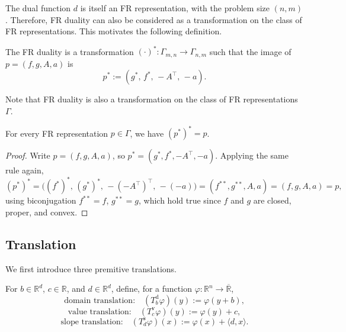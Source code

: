 The dual function $d$ is itself an FR representation, with the problem size \((n, m)\). Therefore, FR duality can also be considered as a transformation on the class of FR representations. This motivates the following definition.


\begin{definition}[FR Duality]
The FR duality is a transformation \((\cdot)^*: \Gamma_{m, n} \to \Gamma_{n, m}\) such that the image of \(p=(f,g,A,a)\) is
\[
p^*
:=
(g^*,\,f^*,\,-A^\top,\,-a).
\]
\end{definition}

Note that FR duality is also a transformation on the class of FR representations $\Gamma$.




 
\begin{proposition}[Involution]
\label{prop:involution}
For every FR representation \(p \in \Gamma\), we have \((p^*)^*=p\).
\end{proposition}

\begin{proof}
Write \(p=(f,g,A,a)\), so \(p^*=(g^*,f^*,-A^\top,-a)\). Applying the
same rule again,
\[
(p^*)^*
=
\bigl((f^*)^*,\,(g^*)^*,\,-(-A^\top)^\top,\,-(-a)\bigr)
=
(f^{**},g^{**},A,a)
=
(f,g,A,a)
=
p,
\]
using biconjugation \(f^{**}=f\), \(g^{**}=g\), which hold true since $f$ and $g$ are closed, proper, and convex.
\end{proof}


















\subsection{Translation}

We first introduce three premitive translations.

\begin{definition}
For \(b\in\mathbb R^d\), \(c\in\mathbb R\), and \(d\in\mathbb R^d\),
define, for a function \(\varphi: \mathbb R^n \rightarrow \overline{\mathbb R}\),
\[
\text{domain translation:}
\quad
(T^{\mathrm d}_b \varphi)(y):=\varphi(y+b),
\]
\[
\text{value translation:}
\quad
(T^{\mathrm v}_c \varphi)(y):=\varphi(y)+c,
\]
\[
\text{slope translation:}
\quad
(T^{\mathrm s}_d\varphi)(x):=\varphi(x)+\langle d,x\rangle.
\]
\end{definition}

